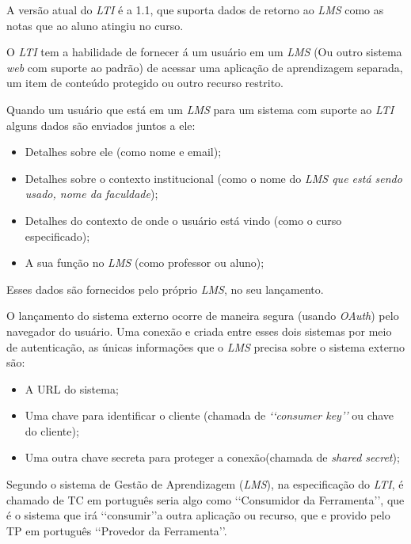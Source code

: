 A versão atual do \textit{LTI} é a 1.1, que suporta dados de retorno ao \textit{LMS} como as notas que ao aluno atingiu no curso.

\begin{citacao}
  O \textit{LTI} tem a habilidade de fornecer á um usuário em um \textit{LMS} (Ou outro sistema \textit{web} com suporte ao padrão) de acessar uma aplicação de aprendizagem separada, um item de conteúdo protegido ou outro recurso restrito. \cite[p.~2, tradução nossa]{vickers-ims}
\end{citacao}

Quando um usuário que está em um \textit{LMS} para um sistema com suporte ao \textit{LTI} alguns dados são enviados juntos a ele:
\begin{itemize}
    \item Detalhes sobre ele (como nome e email);
    \item Detalhes sobre o contexto institucional (como o nome do \textit{LMS que está sendo usado, nome da faculdade});
    \item Detalhes do contexto de onde o usuário está vindo (como o curso especificado);
    \item A sua função no \textit{LMS} (como professor ou aluno);
\end{itemize}
Esses dados são fornecidos pelo próprio \textit{LMS}, no seu lançamento.

O lançamento do sistema externo ocorre de maneira segura (usando \textit{OAuth}) pelo navegador do usuário. Uma conexão e criada entre esses dois sistemas por meio de autenticação, as únicas informações que o \textit{LMS} precisa sobre o sistema externo são:
\begin{itemize}
    \item A \ac{URL} do sistema;
    \item Uma chave para identificar o cliente (chamada de \textit{\lq\lq consumer key\rq\rq} ou chave do cliente);
    \item Uma outra chave secreta para proteger a conexão(chamada de \textit{shared secret});
\end{itemize}

Segundo  o sistema de Gestão de Aprendizagem (\textit{LMS}), na especificação do \textit{LTI}, é chamado de \ac{TC} em português seria algo como \lq\lq Consumidor da Ferramenta\rq\rq, que é o sistema que irá \lq\lq consumir\rq\rq a outra aplicação ou recurso, que e provido pelo \ac{TP} em português \lq\lq Provedor da Ferramenta\rq\rq.

